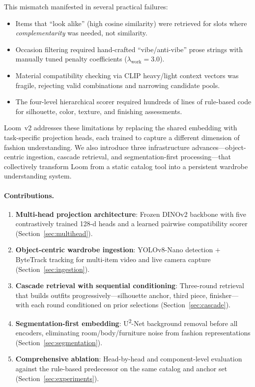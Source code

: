 \documentclass[10pt,twocolumn]{article}
\begin{document}
This mismatch manifested in several practical failures:
\begin{itemize}[leftmargin=*,topsep=2pt,itemsep=1pt]
\item Items that ``look alike'' (high cosine similarity) were retrieved for
  slots where \emph{complementarity} was needed, not similarity.
\item Occasion filtering required hand-crafted ``vibe/anti-vibe'' prose
  strings with manually tuned penalty coefficients
  ($\lambda_{\text{work}} = 3.0$).
\item Material compatibility checking via CLIP heavy/light context vectors
  was fragile, rejecting valid combinations and narrowing candidate pools.
\item The four-level hierarchical scorer required hundreds of lines of
  rule-based code for silhouette, color, texture, and finishing
  assessments.
\end{itemize}

Loom~v2 addresses these limitations by replacing the shared embedding with
task-specific projection heads, each trained to capture a different
dimension of fashion understanding.  We also introduce three
infrastructure advances---object-centric ingestion, cascade retrieval, and
segmentation-first processing---that collectively transform Loom from a
static catalog tool into a persistent wardrobe understanding system.

\paragraph{Contributions.}
\begin{enumerate}[leftmargin=*,topsep=2pt,itemsep=1pt]
\item \textbf{Multi-head projection architecture}: Frozen DINOv2
  backbone with five contrastively trained 128-d heads and a learned
  pairwise compatibility scorer (Section~\ref{sec:multihead}).
\item \textbf{Object-centric wardrobe ingestion}: YOLOv8-Nano detection
  $+$ ByteTrack tracking for multi-item video and live camera capture
  (Section~\ref{sec:ingestion}).
\item \textbf{Cascade retrieval with sequential conditioning}:
  Three-round retrieval that builds outfits progressively---silhouette
  anchor, third piece, finisher---with each round conditioned on prior
  selections (Section~\ref{sec:cascade}).
\item \textbf{Segmentation-first embedding}: U\textsuperscript{2}-Net
  background removal before all encoders, eliminating room/body/furniture
  noise from fashion representations (Section~\ref{sec:segmentation}).
\item \textbf{Comprehensive ablation}: Head-by-head and component-level
  evaluation against the rule-based predecessor on the same catalog and
  anchor set (Section~\ref{sec:experiments}).
\end{enumerate}
\end{document}
